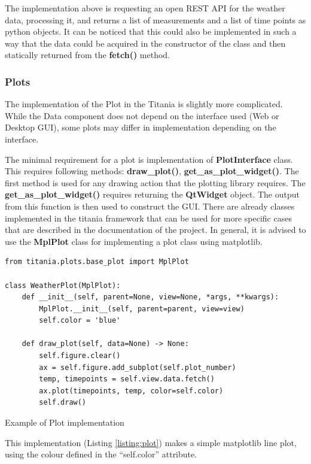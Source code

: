 The implementation above is requesting an open REST API for the weather data, processing it, and returns a list of measurements and a list of time points as python objects.
It can be noticed that this could also be implemented in such a way that the data could be acquired in the constructor of the class and then statically returned from the \textbf{fetch()} method.

\subsubsection{Plots}

The implementation of the Plot in the Titania is slightly more complicated. While the Data component does not depend on the interface used (Web or Desktop GUI), some plots may differ in implementation depending on the interface.

The minimal requirement for a plot is implementation of \textbf{PlotInterface} class.
This requires following methods: \textbf{draw\_plot()}, \textbf{get\_as\_plot\_widget()}.
The first method is used for any drawing action that the plotting library requires.
The \textbf{get\_as\_plot\_widget()} requires returning the \textbf{QtWidget} object.
The output from this function is then used to construct the GUI.
There are already classes implemented in the titania framework that can be used for more specific cases that are described in the documentation of the project.
In general, it is advised to use the \textbf{MplPlot} class for implementing a plot class using matplotlib.


\begin{listing}[!ht]
\begin{verbatim}
from titania.plots.base_plot import MplPlot

class WeatherPlot(MplPlot):
    def __init__(self, parent=None, view=None, *args, **kwargs):
        MplPlot.__init__(self, parent=parent, view=view)
        self.color = 'blue'

    def draw_plot(self, data=None) -> None:
        self.figure.clear()
        ax = self.figure.add_subplot(self.plot_number)
        temp, timepoints = self.view.data.fetch()
        ax.plot(timepoints, temp, color=self.color)
        self.draw()
\end{verbatim}
\caption{Example of Plot implementation}
\label{listing:plot}
\end{listing}

This implementation (Listing \ref{listing:plot}) makes a simple matplotlib line plot, using the colour defined in the ``self.color'' attribute.

